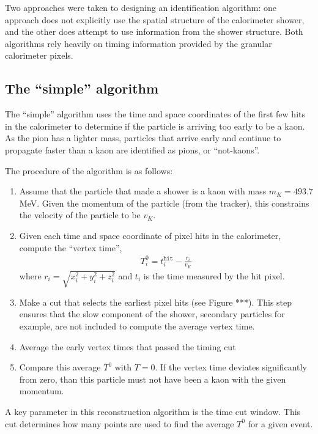 \documentclass[12pt,twoside,letterpaper]{article}
\begin{document}
Two approaches were taken to designing an identification algorithm: one approach does not explicitly use the spatial structure of the calorimeter shower, and the other does attempt to use information from the shower structure. Both algorithms rely heavily on timing information provided by the granular calorimeter pixels. 

\subsection{The ``simple'' algorithm}

The ``simple'' algorithm uses the time and space coordinates of the first few hits in the calorimeter to determine if the particle is arriving too early to be a kaon. As the pion has a lighter mass, particles that arrive early and continue to propagate faster than a kaon are identified as pions, or ``not-kaons''. 

The procedure of the algorithm is as follows:


\begin{enumerate}
\item Assume that the particle that made a shower is a kaon with mass $m_K = 493.7$MeV. Given the momentum of the particle (from the tracker), this constrains the velocity of the particle to be $v_K$. 
\item Given each time and space coordinate of pixel hits in the calorimeter, compute the ``vertex time'',\\
\begin{align}
T^{0}_{i} = t^{\texttt{hit}}_{i} - \frac{r_i}{v_K}
\end{align}
where $r_i = \sqrt{x_i^2 + y_i^2 + z_i^2}$ and $t_i$ is the time measured by the hit pixel. 
\item Make a cut that selects the earliest pixel hits (see Figure ***). This step ensures that the slow component of the shower, secondary particles for example, are not included to compute the average vertex time. 
\item Average the early vertex times that passed the timing cut
\item Compare this average $T^0$ with $T = 0$. If the vertex time deviates significantly from zero, than this particle must not have been a kaon with the given momentum. 
\end{enumerate}

A key parameter in this reconstruction algorithm is the time cut window. This cut determines how many points are used to find the average $T^0$ for a given event. 
\end{document}
